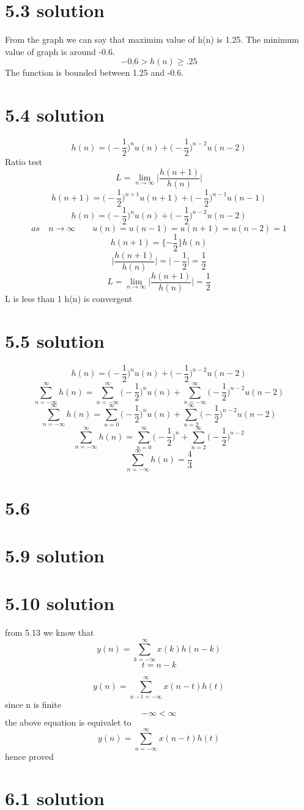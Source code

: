 \documentclass{article}
\begin{document}
\section{5.3 solution}
From the graph we can say that maximim value of h(n) is 1.25. 
The minimum value of graph is around -0.6.
$$-0.6 >h(n)\geq.25$$
The function is bounded between 1.25 and -0.6.
\section{5.4 solution}
$$h(n)=\bigg(-\frac{1}{2}\bigg)^nu(n)+\bigg(-\frac{1}{2}\bigg)^{n-2}u(n-2)$$
Ratio test
$$L=\lim_{n\to\infty} \bigg|\frac{h(n+1)}{h(n)}\bigg|$$
$$h(n+1)=\bigg(-\frac{1}{2}\bigg)^{n+1}u(n+1)+\bigg(-\frac{1}{2}\bigg)^{n-1}u(n-1)$$
$$h(n)=\bigg(-\frac{1}{2}\bigg)^nu(n)+\bigg(-\frac{1}{2}\bigg)^{n-2}u(n-2)$$
$$ as \quad n \rightarrow \infty \qquad u(n)=u(n-1)=u(n+1)=u(n-2)=1$$
$$h(n+1)={\{-\frac{1}{2}}\}{h(n)}$$
$$\bigg|\frac{h(n+1)}{h(n)}\bigg|=\bigg|-\frac{1}{2}\bigg|=\frac{1}{2}$$
$$L=\lim_{n\to\infty} \bigg|\frac{h(n+1)}{h(n)}\bigg|=\frac{1}{2}$$
L is less than 1 h(n) is convergent
\section{5.5 solution}
$$h(n)=\bigg(-\frac{1}{2}\bigg)^nu(n)+\bigg(-\frac{1}{2}\bigg)^{n-2}u(n-2)$$
$$\sum_{n=-\infty}^{\infty}h(n)=\sum_{n=-\infty}^{\infty}\bigg(-\frac{1}{2}\bigg)^nu(n)+\sum_{n=-\infty}^{\infty}\bigg(-\frac{1}{2}\bigg)^{n-2}u(n-2)$$
$$\sum_{n=-\infty}^{\infty}h(n)=\sum_{n=0}^{\infty}\bigg(-\frac{1}{2}\bigg)^nu(n)+\sum_{n=2}^{\infty}\bigg(-\frac{1}{2}\bigg)^{n-2}u(n-2)$$
$$\sum_{n=-\infty}^{\infty}h(n)=\sum_{n=0}^{\infty}\bigg(-\frac{1}{2}\bigg)^n+\sum_{n=2}^{\infty}\bigg(-\frac{1}{2}\bigg)^{n-2}$$
$$\sum_{n=-\infty}^{\infty}h(n)=\frac{4}{3}$$
\section{5.6}
\section{5.9 solution}
\section{5.10 solution}
from 5.13 we know that
$$y(n)=\sum_{k=-\infty}^{\infty}x(k)h(n-k)$$
$$t=n-k$$

$$y(n)=\sum_{n-t=-\infty}^{\infty}x(n-t)h(t) $$
since n is finite 
$$-\infty<\infty$$
the above equation is equivalet to
$$y(n)=\sum_{n=-\infty}^{\infty}x(n-t)h(t) $$
hence proved
\section{6.1 solution}
\end{document}
